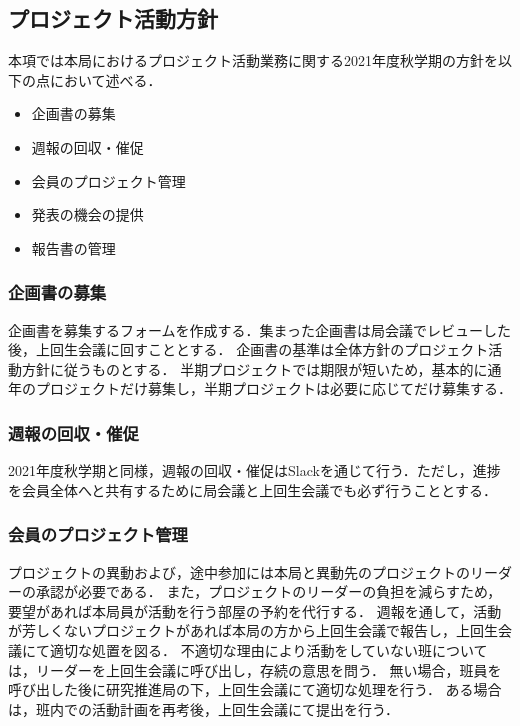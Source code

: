 \subsection*{プロジェクト活動方針}


本項では本局におけるプロジェクト活動業務に関する2021年度秋学期の方針を以下の点において述べる．

\begin{itemize}
  \item 企画書の募集
  \item 週報の回収・催促
  \item 会員のプロジェクト管理
  \item 発表の機会の提供
  \item 報告書の管理
\end{itemize}

\subsubsection*{企画書の募集}

企画書を募集するフォームを作成する．集まった企画書は局会議でレビューした後，上回生会議に回すこととする．
企画書の基準は全体方針のプロジェクト活動方針に従うものとする．
半期プロジェクトでは期限が短いため，基本的に通年のプロジェクトだけ募集し，半期プロジェクトは必要に応じてだけ募集する．

\subsubsection*{週報の回収・催促}

2021年度秋学期と同様，週報の回収・催促はSlackを通じて行う．ただし，進捗を会員全体へと共有するために局会議と上回生会議でも必ず行うこととする．

\subsubsection*{会員のプロジェクト管理}

プロジェクトの異動および，途中参加には本局と異動先のプロジェクトのリーダーの承認が必要である．
また，プロジェクトのリーダーの負担を減らすため，要望があれば本局員が活動を行う部屋の予約を代行する．
週報を通して，活動が芳しくないプロジェクトがあれば本局の方から上回生会議で報告し，上回生会議にて適切な処置を図る．
不適切な理由により活動をしていない班については，リーダーを上回生会議に呼び出し，存続の意思を問う．
無い場合，班員を呼び出した後に研究推進局の下，上回生会議にて適切な処理を行う．
ある場合は，班内での活動計画を再考後，上回生会議にて提出を行う．

